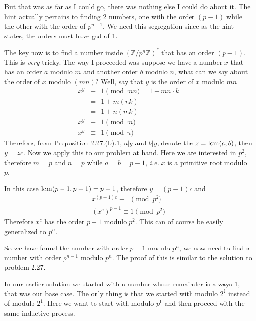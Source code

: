 \documentclass[aps,preprint,preprintnumbers,nofootinbib,showpacs,prd]{revtex4-1}
\newcommand{\ie}{{\it i.e.} }
\newcommand{\nbea}{\begin{eqnarray*}}
\newcommand{\neea}{\end{eqnarray*}}
\begin{document}
But that was as far as I could go, there was nothing else I could do about it. The hint actually pertains to finding 2 numbers, one with the order $(p-1)$ while the other with the order of $p^{n-1}$. We need this segregation since as the hint states, the orders must have gcd of 1.

The key now is to find a number inside $(\mathbb{Z}/p^n\mathbb{Z})^*$ that has an order $(p-1)$. This is {\it very} tricky. The way I proceeded was suppose we have a number $x$ that has an order $a$ modulo $m$ and another order $b$  modulo $n$, what can we say about the order of $x$ modulo $(mn)$? Well, say that $y$ is the order of $x$ modulo $mn$
%
\nbea
x^y & \equiv & 1 \pmod{mn} = 1 + mn\cdot k \\
&= & 1 + m(nk) \\
&= & 1 + n(mk) \\
x^y & \equiv & 1 \pmod{m} \\
x^y & \equiv & 1 \pmod{n}
\neea
% 
Therefore, from Proposition 2.27.(b).1, $a|y$ and $b|y$, denote the $z = {\rm lcm}(a,b)$, then $y = z c$. Now we apply this to our problem at hand. Here we are interested in $p^2$, therefore $m=p$ and $n=p$ while $a=b=p-1$, \ie $x$ is a primitive root modulo $p$.

In this case ${\rm lcm}(p-1,p-1) = p-1$, therefore $y = (p-1)c$ and
%
\nbea
x^{(p-1)c} \equiv 1 \pmod{p^2} \\
(x^c)^{p-1} \equiv 1 \pmod{p^2}
\neea
%
Therefore $x^c$ has the order $p-1$ modulo $p^2$. This can of course be easily generalized to $p^n$.

So we have found the number with order $p-1$ modulo $p^n$, we now need to find a number with order $p^{n-1}$ modulo $p^n$. The proof of this is similar to the solution to problem 2.27.

In our earlier solution we started with a number whose remainder is always 1, that was our base case. The only thing is that we started with modulo $2^2$ instead of modulo $2^1$. Here we want to start with modulo $p^1$ and then proceed with the same inductive process.
\end{document}
